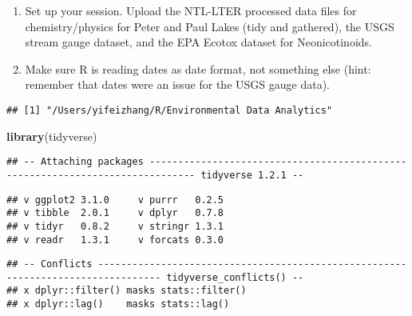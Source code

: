 \documentclass[]{article}
\newenvironment{Shaded}{\begin{snugshade}}{\end{snugshade}}
\newcommand{\KeywordTok}[1]{\textcolor[rgb]{0.13,0.29,0.53}{\textbf{#1}}}
\newcommand{\CommentTok}[1]{\textcolor[rgb]{0.56,0.35,0.01}{\textit{#1}}}
\newcommand{\NormalTok}[1]{#1}
\begin{document}
\begin{enumerate}
\def\labelenumi{\arabic{enumi}.}
\item
  Set up your session. Upload the NTL-LTER processed data files for
  chemistry/physics for Peter and Paul Lakes (tidy and gathered), the
  USGS stream gauge dataset, and the EPA Ecotox dataset for
  Neonicotinoids.
\item
  Make sure R is reading dates as date format, not something else (hint:
  remember that dates were an issue for the USGS gauge data).
\end{enumerate}

\begin{Shaded}
\end{Shaded}

\begin{verbatim}
## [1] "/Users/yifeizhang/R/Environmental Data Analytics"
\end{verbatim}

\begin{Shaded}
\begin{Highlighting}[]
\KeywordTok{library}\NormalTok{(tidyverse)}
\end{Highlighting}
\end{Shaded}

\begin{verbatim}
## -- Attaching packages ------------------------------------------------------------------------------ tidyverse 1.2.1 --
\end{verbatim}

\begin{verbatim}
## v ggplot2 3.1.0     v purrr   0.2.5
## v tibble  2.0.1     v dplyr   0.7.8
## v tidyr   0.8.2     v stringr 1.3.1
## v readr   1.3.1     v forcats 0.3.0
\end{verbatim}

\begin{verbatim}
## -- Conflicts --------------------------------------------------------------------------------- tidyverse_conflicts() --
## x dplyr::filter() masks stats::filter()
## x dplyr::lag()    masks stats::lag()
\end{verbatim}
\end{document}
